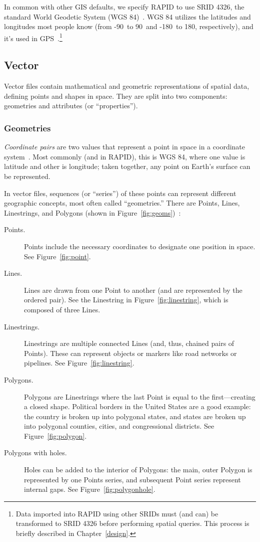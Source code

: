 In common with other GIS defaults, we specify RAPID to use SRID 4326, the standard World Geodetic System (WGS 84)~\cite{Nima2000,SFA}. WGS 84 utilizes the latitudes and longitudes most people know (from -90\textdegree~to 90\textdegree~and -180\textdegree~to 180\textdegree, respectively), and it's used in GPS~\cite{Nima2000}.\footnote{Data imported into RAPID using other SRIDs must (and can) be transformed to SRID 4326 before performing spatial queries. This process is briefly described in Chapter~\ref{design}.}

\subsection{Vector}
\label{sec:vector}
Vector files contain mathematical and geometric representations of spatial data, defining points and shapes in space. They are split into two components: geometries and attributes (or ``properties'').

\subsubsection{Geometries}
\textit{Coordinate pairs} are two values that represent a point in space in a coordinate system~\cite{gentle_intro}. Most commonly (and in RAPID), this is WGS 84, where one value is latitude and other is longitude; taken together, any point on Earth's surface can be represented.

In vector files, sequences (or ``series'') of these points can represent different geographic concepts, most often called ``geometries.'' There are Points, Lines, Linestrings, and Polygons (shown in Figure~\ref{fig:geoms})~\cite{gentle_intro}:

\begin{description}
  \item[Points.] Points include the necessary coordinates to designate one position in space. See Figure~\ref{fig:point}.
  \item[Lines.] Lines are drawn from one Point to another (and are represented by the ordered pair). See the Linestring in Figure~\ref{fig:linestring}, which is composed of three Lines.
  \item[Linestrings.] Linestrings are multiple connected Lines (and, thus, chained pairs of Points). These can represent objects or markers like road networks or pipelines. See Figure~\ref{fig:linestring}.
  \item[Polygons.] Polygons are Linestrings where the last Point is equal to the first---creating a closed shape. Political borders in the United States are a good example: the country is broken up into polygonal states, and states are broken up into polygonal counties, cities, and congressional districts. See Figure~\ref{fig:polygon}.
  \item[Polygons with holes.] Holes can be added to the interior of Polygons: the main, outer Polygon is represented by one Points series, and subsequent Point series represent internal gaps. See Figure~\ref{fig:polygonhole}.
\end{description}


